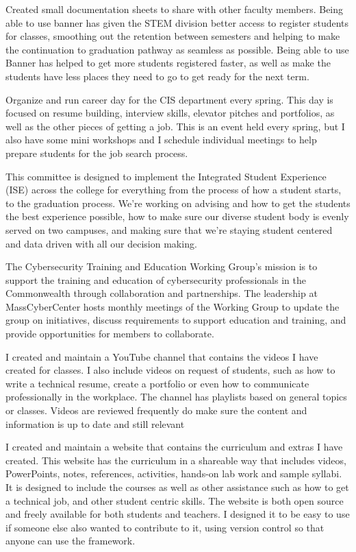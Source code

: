 {
{Created small documentation sheets to share with other faculty members.  Being able to use banner has given the STEM division better access to register students for classes, smoothing out the retention between semesters and helping to make the continuation to graduation pathway as seamless as possible.  Being able to use Banner has helped to get more students registered faster, as well as make the students have less places they need to go to get ready for the next term.}

{Organize and run career day for the CIS department every spring.  This day is focused on resume building, interview skills, elevator pitches and portfolios, as well as the other pieces of getting a job.  This is an event held every spring, but I also have some mini workshops and I schedule individual meetings to help prepare students for the job search process.}

{This committee is designed to implement the Integrated Student Experience (ISE) across the college for everything from the process of how a student starts, to the graduation process.  We're working on advising and how to get the students the best experience possible, how to make sure our diverse student body is evenly served on two campuses, and making sure that we're staying student centered and data driven with all our decision making.}

{The Cybersecurity Training and Education Working Group's mission is to support the training and education of cybersecurity professionals in the Commonwealth through collaboration and partnerships. The leadership at MassCyberCenter hosts monthly meetings of the Working Group to update the group on initiatives, discuss requirements to support education and training, and provide opportunities for members to collaborate.}

{I created and maintain a YouTube channel that contains the videos I have created for classes.  I also include videos on request of students, such as how to write a technical resume, create a portfolio or even how to communicate professionally in the workplace.  The channel has playlists based on general topics or classes.  Videos are reviewed frequently do make sure the content and information is up to date and still relevant}

{I created and maintain a website that contains the curriculum and extras I have created.  This website has the curriculum in a shareable way that includes videos, PowerPoints, notes, references, activities, hands-on lab work and sample syllabi.  It is designed to include the courses as well as other assistance such as how to get a technical job, and other student centric skills. The website is both open source and freely available for both students and teachers. I designed it to be easy to use if someone else also wanted to contribute to it, using version control so that anyone can use the framework.}

}